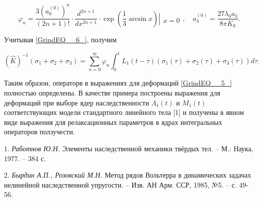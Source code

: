 \[\varphi _{n} =\frac{3(a_{0}^{(0)} )^{n} }{(2n+1)!} \cdot \frac{d^{2n+1} }{dx^{2n+1} } \cdot \exp \left(\frac{1}{3} \arcsin x\right)\left|\begin{array}{l} {} \\ {x=0} \end{array}\right. ,\quad a_{3}^{(0)} =\frac{27\lambda _{0} a_{3} }{8\pi K_{0} } .\]

Учитывая  \eqref{GrindEQ__6_},  получим

\[(\hat{K})^{-1} (\sigma _{1} +\sigma _{2} +\sigma _{3} )=\sum _{n=0}^{\infty }\varphi _{n}  \int _{0}^{t}L_{1}  (t-\tau )(\sigma _{1} (\tau )+\sigma _{2} (\tau )+\sigma _{3} (\tau ))d\tau .\]

Таким образои, операторв в выражениях для деформаций \eqref{GrindEQ__5_} полностью определены. В качестве примера построены выражения для деформаций при выборе ядер наследственности $\Lambda _{1} (t)$ и $M_{1} (t)$ соответствующих модели стандартного линейного тела  [1] и получены в явном виде выражения для релаксационных параметров в ядрах интегральных операторов ползучести.

\litlist

1.
{\it Работнов Ю.Н.} Элементы наследственной механики твёрдых тел. -- М.: Наука, 1977. -- 384 с.

2.
{\it Бырдин А.П., Розовский М.Н.} Метод рядов Вольтерра в динамических задачах  нелинейной наследственной упругости.  -- Изв. АН Арм. ССР, 1985, №5. -- с. 49-56.









